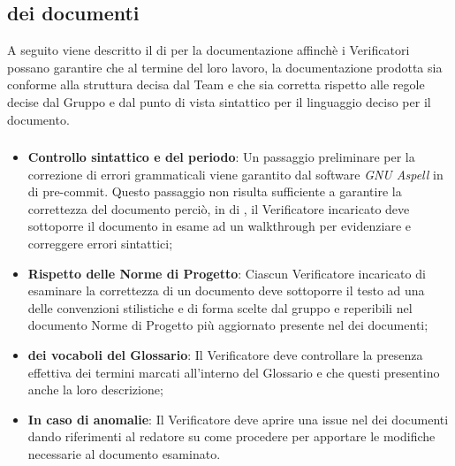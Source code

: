 \subsection{ dei documenti}
A seguito viene descritto il  di  per la documentazione affinchè i Verificatori possano garantire che al termine del loro lavoro, la documentazione prodotta sia conforme alla struttura decisa dal Team e che sia corretta rispetto alle regole decise dal Gruppo e dal punto di vista sintattico per il linguaggio deciso per il documento.

\subsubsection{}
\begin{itemize}
\item \textbf{Controllo sintattico e del periodo}: Un passaggio preliminare per la correzione di errori grammaticali viene garantito dal software \textit{GNU Aspell} in  di pre-commit. Questo passaggio non risulta sufficiente a garantire la correttezza del documento perciò, in  di , il Verificatore incaricato deve sottoporre il documento in esame ad un walkthrough per evidenziare e correggere errori sintattici;
  \item \textbf{Rispetto delle Norme di Progetto}: Ciascun Verificatore incaricato di esaminare la correttezza di un documento deve sottoporre il testo ad una  delle convenzioni stilistiche e di forma scelte dal gruppo e reperibili nel documento Norme di Progetto pi\`u aggiornato presente nel  dei documenti;
  \item \textbf{ dei vocaboli del Glossario}: Il Verificatore deve controllare la presenza effettiva dei termini marcati all'interno del Glossario e che questi presentino anche la loro descrizione;
  \item \textbf{In caso di anomalie}: Il Verificatore deve aprire una issue nel  dei documenti dando riferimenti al redatore su come procedere per apportare le modifiche necessarie al documento esaminato.
\end{itemize}
